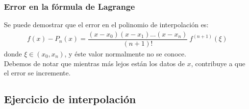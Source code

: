 \documentclass[12pt]{beamer}
\begin{document}
\begin{frame}
\frametitle{Error en la fórmula de Lagrange}
Se puede demostrar que el error en el polinomio de interpolación es:
\pause
\begin{align*}
f (x) - P_{n} (x) = \dfrac{(x - x_{0})(x - x_{1}) \ldots (x - x_{n})}{(n + 1)!} \: f^{(n+1)} (\xi)
\end{align*}
donde $\xi \in (x_{0},x_{n})$, y éste valor normalmente no se conoce. 
\\
\bigskip
\pause
Debemos de notar que mientras más lejos están los datos de $x$, contribuye a que el error se incremente. 
\end{frame}

\subsection{Ejercicio de interpolación}
\end{document}
